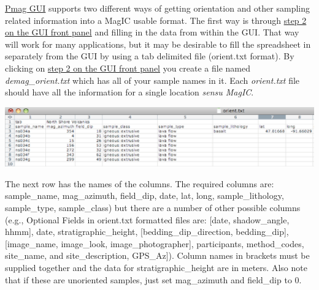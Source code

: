 \documentclass[11pt]{book}
\begin{document}
{\href{#pmag_gui.py}{Pmag GUI}  supports two different ways of getting orientation and other sampling related information into a MagIC usable format.  The first way is through \href{#orient}{step 2 on the GUI front panel} and filling in the data from within the GUI.  That way will work for many applications, but it may be desirable to fill the spreadsheet in separately from the GUI by using  a tab delimited file (orient.txt format).   By clicking on  \href{#orient}{step 2 on the GUI front panel}  you create a file named {\it demag\_orient.txt}  which has all of your sample names in it.   Each {\it orient.txt} file should  have all the information for a single location {\it sensu MagIC}.


  \includegraphics[width=15cm]{EPSfiles/orient.eps}

 The next row has the names of the columns.  The required columns are:  sample\_name, mag\_azimuth, field\_dip, date, lat, long, sample\_lithology, sample\_type, sample\_class) but there are a number of other possible columns (e.g., Optional Fields in orient.txt formatted files are: [date, shadow\_angle, hhmm], date, stratigraphic\_height, [bedding\_dip\_direction, bedding\_dip], [image\_name, image\_look, image\_photographer], participants, method\_codes, site\_name, and site\_description, GPS\_Az]).  Column names in brackets must be supplied together and the data for stratigraphic\_height are in meters.  Also note that if these are unoriented samples, just set mag\_azimuth and field\_dip to 0.


}
\end{document}
